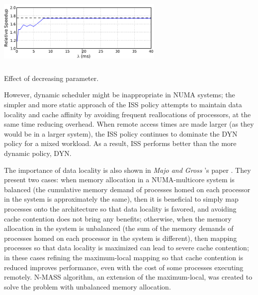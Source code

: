 \documentclass[a4paper,10pt]{article}
\makeatletter
\newenvironment{figurehere}{\def\@captype{figure}\vspace{2ex}}{\vspace{2ex}}
\makeatother
\begin{document}
\begin{multicols}{2}
\begin{figurehere}
 \centering
 \includegraphics[width=8cm, height=3.5cm]{./eps/juggle.png}
 \caption{Effect of decreasing parameter.}
 \label{fig:juggle}
\end{figurehere}

However, dynamic scheduler might be inappropriate in NUMA systems; the simpler and more static approach of the ISS policy attempts to maintain data locality and cache affinity by avoiding frequent reallocations of processors, at the same time reducing overhead. When remote access times are made larger (as they would be in a larger system), the ISS policy continues to dominate the DYN policy for a mixed workload. As a result, ISS performs better than the more dynamic policy, DYN.

The importance of data locality is also shown in \emph{Majo and Gross} 's paper \cite{Majo_memorymanagement}. They present two cases: when memory allocation in a NUMA-multicore system is balanced (the cumulative memory demand of processes homed on each processor in the system is approximately the same), then it is beneficial to simply map processes onto the architecture so that data locality is favored, and avoiding cache contention does not bring any benefits; otherwise, when the memory allocation in the system is unbalanced (the sum of the memory demands of processes homed on each processor in the system is different), then mapping processes so that data locality is maximized can lead to severe cache contention; in these cases refining the maximum-local mapping so that cache contention is reduced improves performance, even with the cost of some processes executing remotely. N-MASS algorithm, an extension of the maximum-local, was created to solve the problem with unbalanced memory allocation.


\end{multicols}
\end{document}
